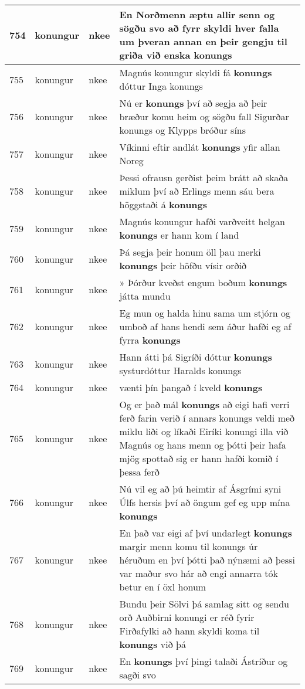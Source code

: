 \documentclass{article}
\begin{document}
\begin{longtable}{p{1cm}|p{1cm}|p{1cm}|p{13cm}}
\hline
754&konungur&nkee&En Norðmenn æptu allir senn og sögðu svo að fyrr skyldi hver falla um þveran annan en þeir gengju til griða við enska \textbf{konungs} \\
\hline
755&konungur&nkee&Magnús konungur skyldi fá \textbf{konungs} dóttur Inga konungs\\
\hline
756&konungur&nkee&Nú er \textbf{konungs} því að segja að þeir bræður komu heim og sögðu fall Sigurðar konungs og Klypps bróður síns\\
\hline
757&konungur&nkee&Víkinni eftir andlát \textbf{konungs} yfir allan Noreg\\
\hline
758&konungur&nkee&Þessi ofrausn gerðist þeim brátt að skaða miklum því að Erlings menn sáu bera höggstaði á \textbf{konungs} \\
\hline
759&konungur&nkee&Magnús konungur hafði varðveitt helgan \textbf{konungs} er hann kom í land\\
\hline
760&konungur&nkee&Þá segja þeir honum öll þau merki \textbf{konungs} þeir höfðu vísir orðið\\
\hline
761&konungur&nkee&» Þórður kveðst engum boðum \textbf{konungs} játta mundu\\
\hline
762&konungur&nkee&Eg mun og halda hinu sama um stjórn og umboð af hans hendi sem áður hafði eg af fyrra \textbf{konungs} \\
\hline
763&konungur&nkee&Hann átti þá Sigríði dóttur \textbf{konungs} systurdóttur Haralds konungs\\
\hline
764&konungur&nkee&vænti þín þangað í kveld \textbf{konungs} \\
\hline
765&konungur&nkee&Og er það mál \textbf{konungs} að eigi hafi verri ferð farin verið í annars konungs veldi með miklu liði og líkaði Eiríki konungi illa við Magnús og hans menn og þótti þeir hafa mjög spottað sig er hann hafði komið í þessa ferð\\
\hline
766&konungur&nkee&Nú vil eg að þú heimtir af Ásgrími syni Úlfs hersis því að öngum gef eg upp mína \textbf{konungs} \\
\hline
767&konungur&nkee&En það var eigi af því undarlegt \textbf{konungs} margir menn komu til konungs úr héruðum en því þótti það nýnæmi að þessi var maður svo hár að engi annarra tók betur en í öxl honum\\
\hline
768&konungur&nkee&Bundu þeir Sölvi þá samlag sitt og sendu orð Auðbirni konungi er réð fyrir Firðafylki að hann skyldi koma til \textbf{konungs} við þá\\
\hline
769&konungur&nkee&En \textbf{konungs} því þingi talaði Ástríður og sagði svo\\

\end{longtable}
\end{document}
